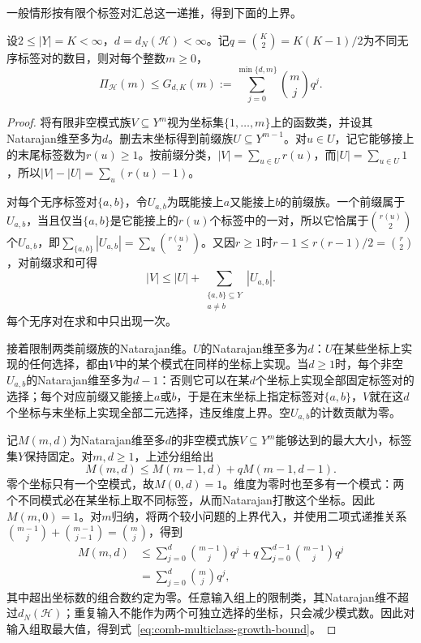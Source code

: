 一般情形按有限个标签对汇总这一递推，得到下面的上界。

\begin{theorem}[有限标签的预测数目上界]
\label{thm:multiclass-growth-bound}
设$2\leq|Y|=K<\infty$，$d=d_N(\mathcal H)<\infty$。记$q=\binom K2=K(K-1)/2$为不同无序标签对的数目，则对每个整数$m\geq0$，
\begin{equation}
  \Pi_{\mathcal H}(m)\leq G_{d,K}(m)
  :=\sum_{j=0}^{\min\{d,m\}}\binom mj q^j.
  \label{eq:comb-multiclass-growth-bound}
\end{equation}
\end{theorem}

\begin{proof}
将有限非空模式族$V\subseteq Y^m$视为坐标集$\{1,\ldots,m\}$上的函数类，并设其Natarajan维至多为$d$。删去末坐标得到前缀族$U\subseteq Y^{m-1}$。对$u\in U$，记它能够接上的末尾标签数为$r(u)\geq1$。按前缀分类，$|V|=\sum_{u\in U}r(u)$，而$|U|=\sum_{u\in U}1$，所以$|V|-|U|=\sum_u(r(u)-1)$。

对每个无序标签对$\{a,b\}$，令$U_{a,b}$为既能接上$a$又能接上$b$的前缀族。一个前缀属于$U_{a,b}$，当且仅当$\{a,b\}$是它能接上的$r(u)$个标签中的一对，所以它恰属于$\binom{r(u)}2$个$U_{a,b}$，即$\sum_{\{a,b\}}|U_{a,b}|=\sum_u\binom{r(u)}2$。又因$r\geq1$时$r-1\leq r(r-1)/2=\binom r2$，对前缀求和可得
\[
  |V|\leq |U|+\sum_{\substack{\{a,b\}\subseteq Y\\a\neq b}}|U_{a,b}|.
\]
每个无序对在求和中只出现一次。

接着限制两类前缀族的Natarajan维。$U$的Natarajan维至多为$d$：$U$在某些坐标上实现的任何选择，都由$V$中的某个模式在同样的坐标上实现。当$d\geq1$时，每个非空$U_{a,b}$的Natarajan维至多为$d-1$：否则它可以在某$d$个坐标上实现全部固定标签对的选择；每个对应前缀又能接上$a$或$b$，于是在末坐标上指定标签对$\{a,b\}$，$V$就在这$d$个坐标与末坐标上实现全部二元选择，违反维度上界。空$U_{a,b}$的计数贡献为零。

记$M(m,d)$为Natarajan维至多$d$的非空模式族$V\subseteq Y^m$能够达到的最大大小，标签集$Y$保持固定。对$m,d\geq1$，上述分组给出
\[
  M(m,d)\leq M(m-1,d)+qM(m-1,d-1).
\]
零个坐标只有一个空模式，故$M(0,d)=1$。维度为零时也至多有一个模式：两个不同模式必在某坐标上取不同标签，从而Natarajan打散这个坐标。因此$M(m,0)=1$。对$m$归纳，将两个较小问题的上界代入，并使用二项式递推关系$\binom{m-1}j+\binom{m-1}{j-1}=\binom mj$，得到
\[
\begin{aligned}
  M(m,d)
  &\leq\sum_{j=0}^{d}\binom{m-1}{j}q^j
       +q\sum_{j=0}^{d-1}\binom{m-1}{j}q^j\\
  &=\sum_{j=0}^{d}\binom mj q^j,
\end{aligned}
\]
其中超出坐标数的组合数约定为零。任意输入组上的限制类，其Natarajan维不超过$d_N(\mathcal H)$；重复输入不能作为两个可独立选择的坐标，只会减少模式数。因此对输入组取最大值，得到式~\eqref{eq:comb-multiclass-growth-bound}。
\end{proof}

